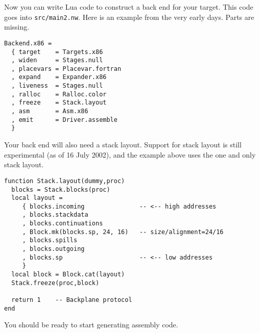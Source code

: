 \documentclass[12pt]{article}
\begin{document}
Now you can write Lua code to construct a back end for your target.
This code goes into \texttt{src/main2.nw}.
Here is an example from the very early days.
Parts are missing.
\begin{verbatim}
Backend.x86 =
  { target    = Targets.x86
  , widen     = Stages.null
  , placevars = Placevar.fortran
  , expand    = Expander.x86
  , liveness  = Stages.null
  , ralloc    = Ralloc.color
  , freeze    = Stack.layout
  , asm       = Asm.x86
  , emit      = Driver.assemble
  }   
\end{verbatim}


Your back end will also need a stack layout.  
Support for stack layout is still experimental (as of 16 July 2002), and
the example above uses
the one and only stack layout.
\begin{verbatim}
function Stack.layout(dummy,proc)
  blocks = Stack.blocks(proc)
  local layout = 
     { blocks.incoming               -- <-- high addresses
     , blocks.stackdata
     , blocks.continuations
     , Block.mk(blocks.sp, 24, 16)   -- size/alignment=24/16
     , blocks.spills
     , blocks.outgoing
     , blocks.sp                     -- <-- low addresses 
     }
  local block = Block.cat(layout)
  Stack.freeze(proc,block)

  return 1    -- Backplane protocol
end
\end{verbatim}

You should be ready to start generating assembly code.
\end{document}
